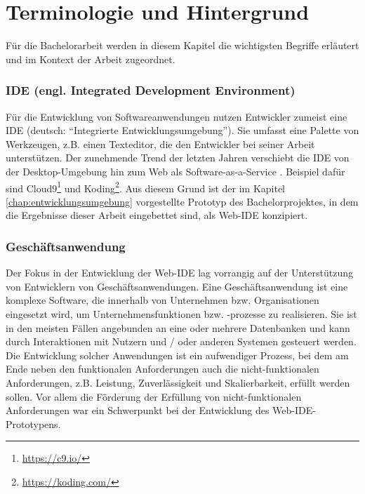 \section{Terminologie und Hintergrund}\label{chap:terminology}

Für die Bachelorarbeit werden in diesem Kapitel die wichtigsten Begriffe erläutert und im Kontext der Arbeit zugeordnet.


\subsubsection{IDE (engl. Integrated Development Environment)}
Für die Entwicklung von Softwareanwendungen nutzen Entwickler zumeist eine IDE (deutsch: ``Integrierte Entwicklungsumgebung'').
Sie umfasst eine Palette von Werkzeugen, z.B. einen Texteditor, die den Entwickler bei seiner Arbeit unterstützen.
Der zunehmende Trend der letzten Jahren verschiebt die IDE von der Desktop-Umgebung hin zum Web als Software-as-a-Service \cite{SIIA}.
Beispiel dafür sind Cloud9\footnote{\url{https://c9.io/}} und Koding\footnote{\url{https://koding.com/}}.
Aus diesem Grund ist der im Kapitel \ref{chap:entwicklungsumgebung} vorgestellte Prototyp des Bachelorprojektes, in dem die Ergebnisse dieser Arbeit eingebettet sind, als Web-IDE konzipiert.

\subsubsection{Geschäftsanwendung}
Der Fokus in der Entwicklung der Web-IDE lag vorrangig auf der Unterstützung von Entwicklern von Geschäftsanwendungen.
Eine Geschäftsanwendung ist eine komplexe Software, die innerhalb von Unternehmen bzw. Organisationen eingesetzt wird, um Unternehmensfunktionen bzw. -prozesse zu realisieren.
Sie ist in den meisten Fällen angebunden an eine oder mehrere Datenbanken und kann durch Interaktionen mit Nutzern und / oder anderen Systemen gesteuert werden.
Die Entwicklung solcher Anwendungen ist ein aufwendiger Prozess, bei dem am Ende neben den funktionalen Anforderungen auch die nicht-funktionalen Anforderungen, z.B. Leistung, Zuverlässigkeit und Skalierbarkeit, erfüllt werden sollen.
Vor allem die Förderung der Erfüllung von nicht-funktionalen Anforderungen war ein Schwerpunkt bei der Entwicklung des Web-IDE-Prototypens.

